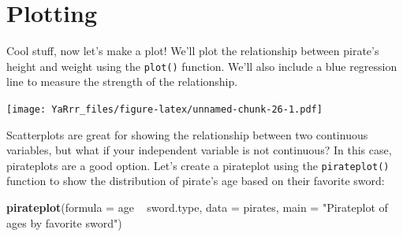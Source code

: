 \documentclass[]{book}
\newenvironment{Shaded}{\begin{snugshade}}{\end{snugshade}}
\newcommand{\KeywordTok}[1]{\textcolor[rgb]{0.13,0.29,0.53}{\textbf{{#1}}}}
\newcommand{\DataTypeTok}[1]{\textcolor[rgb]{0.13,0.29,0.53}{{#1}}}
\newcommand{\DecValTok}[1]{\textcolor[rgb]{0.00,0.00,0.81}{{#1}}}
\newcommand{\StringTok}[1]{\textcolor[rgb]{0.31,0.60,0.02}{{#1}}}
\newcommand{\CommentTok}[1]{\textcolor[rgb]{0.56,0.35,0.01}{\textit{{#1}}}}
\newcommand{\NormalTok}[1]{{#1}}
\theoremstyle{definition}
\theoremstyle{definition}
\theoremstyle{remark}
\begin{document}
\section{Plotting}\label{plotting}

Cool stuff, now let's make a plot! We'll plot the relationship between
pirate's height and weight using the \texttt{plot()} function. We'll
also include a blue regression line to measure the strength of the
relationship.

\begin{Shaded}
\end{Shaded}

\texttt{[image: YaRrr\_files/figure-latex/unnamed-chunk-26-1.pdf]}

Scatterplots are great for showing the relationship between two
continuous variables, but what if your independent variable is not
continuous? In this case, pirateplots are a good option. Let's create a
pirateplot using the \texttt{pirateplot()} function to show the
distribution of pirate's age based on their favorite sword:

\begin{Shaded}
\begin{Highlighting}[]
\KeywordTok{pirateplot}\NormalTok{(}\DataTypeTok{formula =} \NormalTok{age ~}\StringTok{ }\NormalTok{sword.type, }
           \DataTypeTok{data =} \NormalTok{pirates,}
           \DataTypeTok{main =} \StringTok{"Pirateplot of ages by favorite sword"}\NormalTok{)}
\end{Highlighting}
\end{Shaded}
\end{document}
